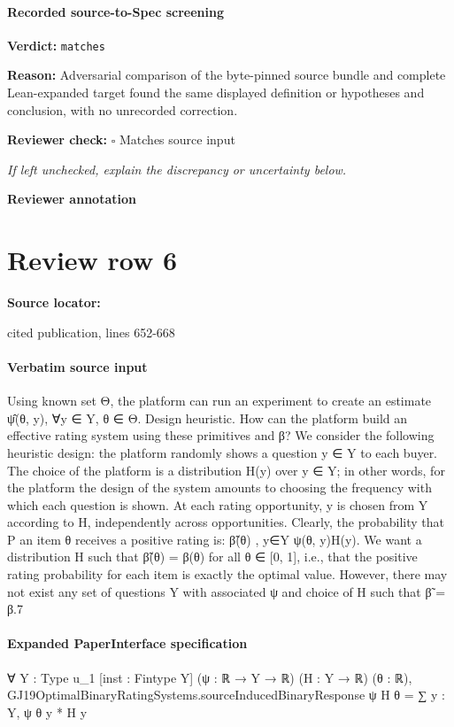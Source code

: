 \documentclass[10pt]{article}
\newcommand{\reviewerbox}{%
  \par\noindent\fbox{\parbox{0.96\linewidth}{\rule{0pt}{0.38in}}}\par
}
\newcommand{\reviewmatch}[1]{%
  \par\noindent\textbf{Reviewer check:} $\square$\; #1\par
  \noindent\emph{If left unchecked, explain the discrepancy or uncertainty below.}\par
}
\begin{document}
\paragraph{Recorded source-to-Spec screening}
\textbf{Verdict:} \texttt{matches}
\\
{\raggedright
\textbf{Reason:} Adversarial comparison of the byte-\allowbreak{}pinned source bundle and complete Lean-\allowbreak{}expanded target found the same displayed definition or hypotheses and conclusion, with no unrecorded correction.\allowbreak{}
\par}
\reviewmatch{Matches source input}
\noindent\textbf{Reviewer annotation}\par
\reviewerbox
\clearpage
\hypertarget{source-claim-a5f9ed46c3edb5c1}{}
\section*{Review row 6}
\textbf{Source locator:} {\footnotesize\raggedright cited publication, lines 652-\allowbreak{}668\par}
\paragraph{Verbatim source input}
\begin{ReviewVerbatim}
Using known set Θ, the platform can run an experiment to create an estimate ψ̂(θ, y), ∀y ∈ Y, θ ∈ Θ.
Design heuristic. How can the platform build an
effective rating system using these primitives and
β? We consider the following heuristic design: the
platform randomly shows a question y ∈ Y to each
buyer. The choice of the platform is a distribution
H(y) over y ∈ Y; in other words, for the platform
the design of the system amounts to choosing the frequency with which each question is shown. At each
rating opportunity, y is chosen from Y according to
H, independently across opportunities.
Clearly, the probability that
P an item θ receives a
positive rating is: β̃(θ) , y∈Y ψ(θ, y)H(y).
We want a distribution H such that β̃(θ) = β(θ) for
all θ ∈ [0, 1], i.e., that the positive rating probability
for each item is exactly the optimal value. However,
there may not exist any set of questions Y with associated ψ and choice of H such that β̃ = β.7
\end{ReviewVerbatim}



\paragraph{Expanded PaperInterface specification}
\begin{ReviewVerbatim}
∀ {Y : Type u_1} [inst : Fintype Y] (ψ : ℝ → Y → ℝ) (H : Y → ℝ) (θ : ℝ),
  GJ19OptimalBinaryRatingSystems.sourceInducedBinaryResponse ψ H θ = ∑ y : Y, ψ θ y * H y
\end{ReviewVerbatim}
\end{document}
